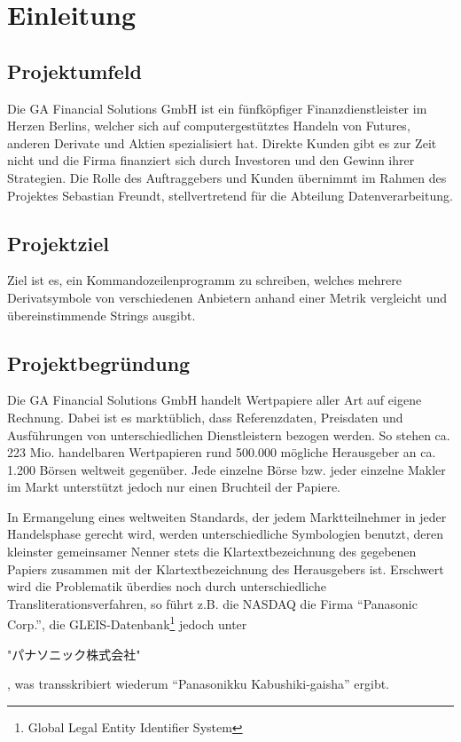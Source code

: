 \section{Einleitung}
\subsection{Projektumfeld}
Die GA Financial Solutions GmbH ist ein fünfköpfiger Finanzdienstleister im
Herzen Berlins, welcher sich auf computergestütztes Handeln
von Futures, anderen Derivate und Aktien spezialisiert hat. Direkte Kunden gibt es zur Zeit
nicht und die Firma finanziert sich durch Investoren und den Gewinn ihrer
Strategien. Die Rolle des Auftraggebers und Kunden übernimmt im Rahmen des
Projektes Sebastian Freundt, stellvertretend für die Abteilung Datenverarbeitung.\par

\subsection{Projektziel}
Ziel ist es, ein Kommandozeilenprogramm zu schreiben, welches mehrere Derivatsymbole 
von verschiedenen Anbietern anhand einer Metrik vergleicht und übereinstimmende 
Strings ausgibt.\par

\subsection{Projektbegründung}
Die GA Financial Solutions GmbH handelt Wertpapiere aller Art auf eigene
Rechnung.  Dabei ist es marktüblich, dass Referenzdaten, Preisdaten
und Ausführungen von unterschiedlichen Dienstleistern bezogen werden.
So stehen ca. 223 Mio. handelbaren Wertpapieren rund 500.000 mögliche
Herausgeber an ca. 1.200 Börsen weltweit gegenüber.  Jede einzelne
Börse bzw. jeder einzelne Makler im Markt unterstützt jedoch nur
einen Bruchteil der Papiere.\par

In Ermangelung eines weltweiten Standards, der jedem Marktteilnehmer in
jeder Handelsphase gerecht wird, werden unterschiedliche Symbologien
benutzt, deren kleinster gemeinsamer Nenner stets die
Klartextbezeichnung des gegebenen Papiers zusammen mit der
Klartextbezeichnung des Herausgebers ist. Erschwert wird die
Problematik überdies noch durch unterschiedliche Transliterationsverfahren,
so führt z.B. die NASDAQ die Firma "`Panasonic Corp."',
die GLEIS-Datenbank\footnote{Global Legal Entity Identifier System} jedoch unter
\begin{CJK}{UTF8}{min}
"パナソニック株式会社"
\end{CJK}%
, was transskribiert wiederum "`Panasonikku Kabushiki-gaisha"' ergibt. \par


